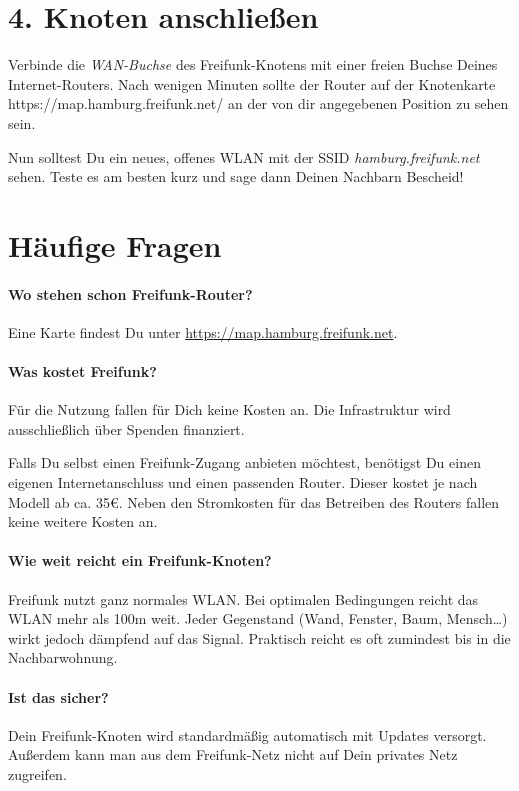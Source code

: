 \documentclass[10pt,a4paper,notumble]{leaflet}
\begin{document}
\section{4. Knoten anschließen}
Verbinde die \textit{WAN-Buchse} des Freifunk-Knotens mit einer freien Buchse Deines Internet-Routers. Nach wenigen Minuten sollte der Router auf der Knotenkarte \mbox{https://map.hamburg.freifunk.net/} an der von dir angegebenen Position zu sehen sein.

Nun solltest Du ein neues, offenes WLAN mit der SSID \mbox{\textit{hamburg.freifunk.net}} sehen. Teste es am besten kurz und sage dann Deinen Nachbarn Bescheid!




\newpage
\section{Häufige Fragen}
\setlength{\parskip}{0.1em}
\paragraph{Wo stehen schon Freifunk-Router?} Eine Karte findest Du unter \href{https://map.hamburg.freifunk.net}{https://map.hamburg.freifunk.net}.

\paragraph{Was kostet Freifunk?}
Für die Nutzung fallen für Dich keine Kosten an. Die Infrastruktur wird ausschließlich über Spenden finanziert.

Falls Du selbst einen Freifunk-Zugang anbieten möchtest, benötigst Du einen eigenen Internetanschluss und einen passenden Router. Dieser kostet je nach Modell ab ca. 35€.  Neben den Stromkosten für das Betreiben des Routers fallen keine weitere Kosten an.

\paragraph{Wie weit reicht ein Freifunk-Knoten?} Freifunk nutzt ganz normales WLAN. Bei optimalen Bedingungen reicht das WLAN mehr als 100m weit. Jeder Gegenstand (Wand, Fenster, Baum, Mensch…) wirkt jedoch dämpfend auf das Signal. Praktisch reicht es oft zumindest bis in die Nachbarwohnung.

\paragraph{Ist das sicher?} Dein Freifunk-Knoten wird standardmäßig automatisch mit Updates versorgt. Außerdem kann man aus dem Freifunk-Netz nicht auf Dein privates Netz zugreifen.
\end{document}
